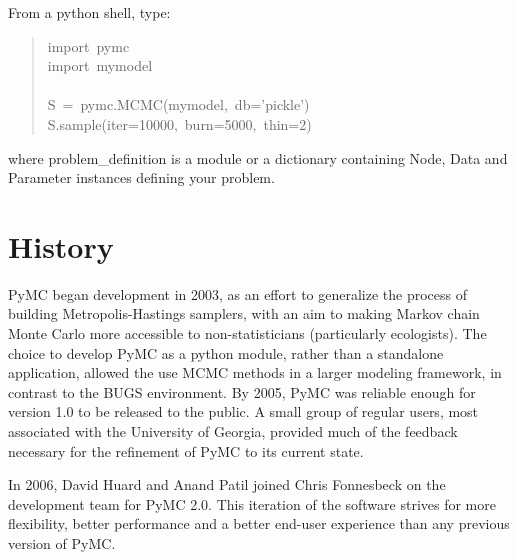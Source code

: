 From a python shell, type:
\begin{quote}{\ttfamily \raggedright \noindent
import~pymc~\\
import~mymodel~\\
~\\
S~=~pymc.MCMC(mymodel,~db='pickle')~\\
S.sample(iter=10000,~burn=5000,~thin=2)
}\end{quote}

where problem{\_}definition is a module or a dictionary containing Node, Data and
Parameter instances defining your problem.



\hypertarget{history}{}
\section*{History}
\label{history}

PyMC began development in 2003, as an effort to generalize the process of building Metropolis-Hastings samplers, with an aim to making Markov chain Monte Carlo more accessible to non-statisticians (particularly ecologists). The choice to develop PyMC as a python module, rather than a standalone application, allowed the use MCMC methods in a larger modeling framework, in contrast to the BUGS environment. By 2005, PyMC was reliable enough for version 1.0 to be released to the public. A small group of regular users, most associated with the University of Georgia, provided much of the feedback necessary for the refinement of PyMC to its current state.

In 2006, David Huard and Anand Patil joined Chris Fonnesbeck on the development team for PyMC 2.0. This iteration of the software strives for more flexibility, better performance and a better end-user experience than any previous version of PyMC.



